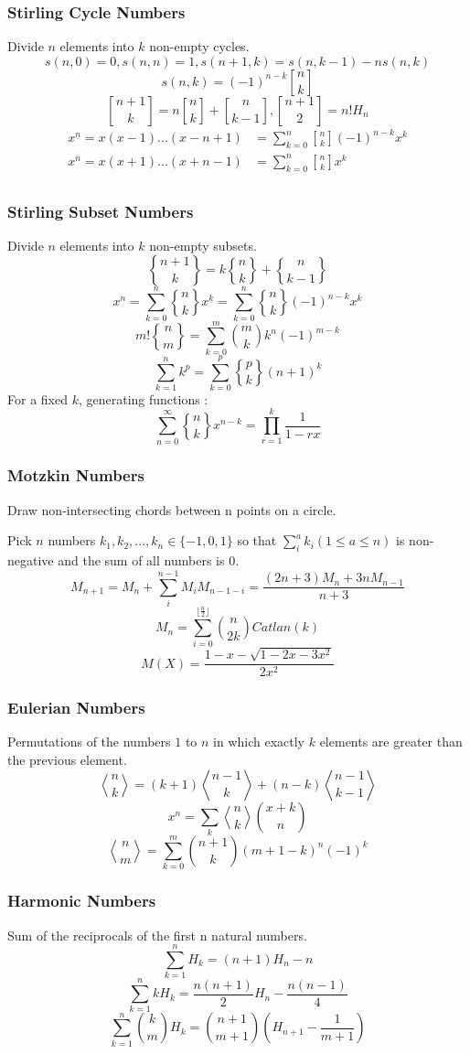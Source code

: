 \subsubsection{Stirling Cycle Numbers}
Divide $n$ elements into $k$ non-empty cycles.
\[s(n,0)=0,s(n,n)=1,s(n+1,k)=s(n,k-1)-ns(n,k)\]
\[s(n,k)=(-1)^{n-k}{n \brack k}\]
\[{n+1 \brack k} = n{n \brack k} + {n \brack k-1},{n+1 \brack 2} = n!H_n\]
 \begin{align*}
x^{\underline{n}} = x(x-1)...(x-n+1) &= \sum_{k=0}^n{ {n \brack k}(-1)^{n-k}x^k }\\
x^{\overline{n}} = x(x+1)...(x+n-1) &= \sum_{k=0}^n{ {n \brack k}x^k }\\
 \end{align*}
\subsubsection{Stirling Subset Numbers}
Divide $n$ elements into $k$ non-empty subsets.
\[ {n+1 \brace k} = k{n \brace k} + {n \brace k-1} \]
\[ x^n = \sum_{k=0}^n{ {n \brace k}x^{\underline{k}} } = \sum_{k=0}^n{ {n \brace k}(-1)^{n-k}x^{\overline{k}} } \]
\[ m!{n \brace m} = \sum_{k=0}^m{m \choose k}k^n(-1)^{m-k} \]
\[ \sum_{k=1}^nk^p = \sum_{k=0}^p{p \brace k}(n+1)^{\underline{k}} \]
For a fixed $k$, generating functions :
\[\sum_{n=0}^{\infty}{n \brace k}x^{n-k}=\prod_{r=1}^{k}\frac{1}{1-rx}\]
\subsubsection{Motzkin Numbers}
Draw non-intersecting chords between n points on a circle.

Pick $n$ numbers $k_1,k_2,...,k_n\in\{-1,0,1\}$ so that $\sum_i^ak_i(1\leq a\leq n)$ is non-negative and the sum of all numbers is $0$.
\[M_{n+1}=M_n+\sum_i^{n-1}M_iM_{n-1-i}=\frac{(2n+3)M_n+3nM_{n-1}}{n+3}\]
\[M_n=\sum_{i=0}^{\lfloor \frac{n}{2}\rfloor}\binom{n}{2k}Catlan(k)\]
\[M(X)=\frac{1-x-\sqrt{1-2x-3x^2}}{2x^2}\]
\subsubsection{Eulerian Numbers}
Permutations of the numbers $1$ to $n$ in which exactly $k$ elements are greater than the previous element.
\[ {n \bangle k} = (k+1){n-1 \bangle k} + (n-k){n-1 \bangle k-1} \]
\[ x^n = \sum_k{ {n \bangle k}{x+k \choose n} } \]
\[ {n \bangle m} = \sum_{k=0}^m{n+1 \choose k}(m+1-k)^n(-1)^k \]
\subsubsection{Harmonic Numbers}
Sum of the reciprocals of the first n natural numbers.
\[ \sum_{k=1}^nH_k = (n+1)H_n-n \]
\[ \sum_{k=1}^nkH_k = \frac{n(n+1)}{2}H_n - \frac{n(n-1)}{4} \]
\[ \sum_{k=1}^n{k \choose m}H_k = {n+1 \choose m+1}(H_{n+1} - \frac{1}{m+1}) \]
